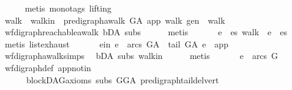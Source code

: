 \begin{isabellebody}
\ \ \ \ \isamarkupfalse%
\ {\isacharparenleft}{\kern0pt}metis\ {\isacharparenleft}{\kern0pt}mono{\isacharunderscore}{\kern0pt}tags{\isacharcomma}{\kern0pt}\ lifting{\isacharparenright}{\kern0pt}{\isacharparenright}{\kern0pt}\isanewline
\ \ \isamarkupfalse%
\ \isamarkupfalse%
\ walk\ \ walk{\isacharunderscore}{\kern0pt}in{\isacharcolon}{\kern0pt}\ {\isachardoublequoteopen}\ pre{\isacharunderscore}{\kern0pt}digraph{\isachardot}{\kern0pt}awalk\ G{\isacharunderscore}{\kern0pt}A\ app\ walk\ gen\ {\isasymand}\ walk\ {\isasymnoteq}\ {\isacharbrackleft}{\kern0pt}{\isacharbrackright}{\kern0pt}{\isachardoublequoteclose}\ \isanewline
\ \ \ \ \isamarkupfalse%
\ wf{\isacharunderscore}{\kern0pt}digraph{\isachardot}{\kern0pt}reachable{}{\isacharunderscore}{\kern0pt}awalk\ bD{\isacharunderscore}{\kern0pt}A\ subs\isanewline
\ \ \ \ \isamarkupfalse%
\ metis\ \isanewline
\ \ \isamarkupfalse%
\ \isamarkupfalse%
\ e\ \ {\isachardoublequoteopen}{\isasymexists}es{\isachardot}{\kern0pt}\ walk\ {\isacharequal}{\kern0pt}\ e\ {\isacharhash}{\kern0pt}\ es{\isachardoublequoteclose}\isanewline
\ \ \ \ \isamarkupfalse%
\ {\isacharparenleft}{\kern0pt}metis\ list{\isachardot}{\kern0pt}exhaust{\isacharparenright}{\kern0pt}\ \isanewline
\ \ \isamarkupfalse%
\ \isamarkupfalse%
\ e{\isacharunderscore}{\kern0pt}in{\isacharcolon}{\kern0pt}\ {\isachardoublequoteopen}e\ {\isasymin}\ arcs\ G{\isacharunderscore}{\kern0pt}A\ {\isasymand}\ tail\ G{\isacharunderscore}{\kern0pt}A\ e\ {\isacharequal}{\kern0pt}\ app{\isachardoublequoteclose}\isanewline
\ \ \ \ \isamarkupfalse%
\ wf{\isacharunderscore}{\kern0pt}digraph{\isachardot}{\kern0pt}awalk{\isacharunderscore}{\kern0pt}simps{\isacharparenleft}{\kern0pt}{}{\isacharparenright}{\kern0pt}\isanewline
\ \ bD{\isacharunderscore}{\kern0pt}A\ subs\ walk{\isacharunderscore}{\kern0pt}in\isanewline
\ \ \ \ \isamarkupfalse%
\ metis\ \isanewline
\ \ \isamarkupfalse%
\ \isamarkupfalse%
\ {\isachardoublequoteopen}e\ {\isasymnotin}\ arcs\ G{\isachardoublequoteclose}\ \isamarkupfalse%
\ wf{\isacharunderscore}{\kern0pt}digraph{\isacharunderscore}{\kern0pt}def\ app{\isacharunderscore}{\kern0pt}notin\ \isanewline
\ \ \ \ \ \ blockDAG{\isacharunderscore}{\kern0pt}axioms\ subs\ GG{\isacharunderscore}{\kern0pt}A\ pre{\isacharunderscore}{\kern0pt}digraph{\isachardot}{\kern0pt}tail{\isacharunderscore}{\kern0pt}del{\isacharunderscore}{\kern0pt}vert\isanewline

\end{isabellebody}
